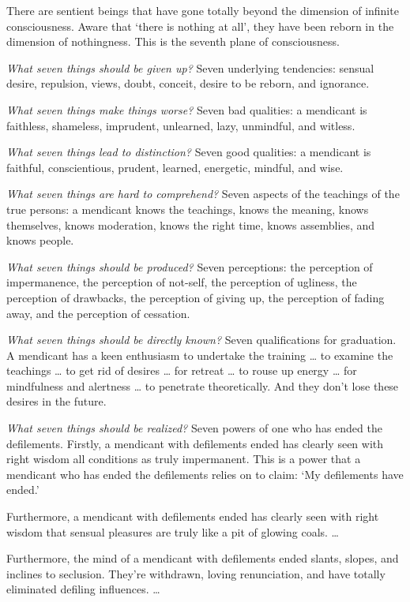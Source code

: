 \documentclass[12pt,openany]{book}%
\begin{document}
There are sentient beings that have gone totally beyond the dimension of infinite consciousness. Aware that ‘there is nothing at all’, they have been reborn in the dimension of nothingness. This is the seventh plane of consciousness. 

\emph{What seven things should be given up?} Seven underlying tendencies: sensual desire, repulsion, views, doubt, conceit, desire to be reborn, and ignorance. 

\emph{What seven things make things worse?} Seven bad qualities: a mendicant is faithless, shameless, imprudent, unlearned, lazy, unmindful, and witless. 

\emph{What seven things lead to distinction?} Seven good qualities: a mendicant is faithful, conscientious, prudent, learned, energetic, mindful, and wise. 

\emph{What seven things are hard to comprehend?} Seven aspects of the teachings of the true persons: a mendicant knows the teachings, knows the meaning, knows themselves, knows moderation, knows the right time, knows assemblies, and knows people. 

\emph{What seven things should be produced?} Seven perceptions: the perception of impermanence, the perception of not-self, the perception of ugliness, the perception of drawbacks, the perception of giving up, the perception of fading away, and the perception of cessation. 

\emph{What seven things should be directly known?} Seven qualifications for graduation. A mendicant has a keen enthusiasm to undertake the training … to examine the teachings … to get rid of desires … for retreat … to rouse up energy … for mindfulness and alertness … to penetrate theoretically. And they don’t lose these desires in the future. 

\emph{What seven things should be realized?} Seven powers of one who has ended the defilements. Firstly, a mendicant with defilements ended has clearly seen with right wisdom all conditions as truly impermanent. This is a power that a mendicant who has ended the defilements relies on to claim: ‘My defilements have ended.’ 

Furthermore, a mendicant with defilements ended has clearly seen with right wisdom that sensual pleasures are truly like a pit of glowing coals. … 

Furthermore, the mind of a mendicant with defilements ended slants, slopes, and inclines to seclusion. They’re withdrawn, loving renunciation, and have totally eliminated defiling influences. … 
\end{document}
